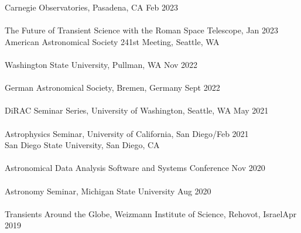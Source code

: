 \documentclass[10pt]{cv}
\begin{document}
\begin{llist}
\vspace{-0.1in}  
Carnegie Observatories, Pasadena, CA \hfill Feb 2023\\\vspace{-0.1in}%
\\
The Future of Transient Science with the Roman Space Telescope, \hfill Jan 2023\\
American Astronomical Society 241st Meeting, Seattle, WA\\ \vspace{-0.1in}%
\\
Washington State University, Pullman, WA \hfill Nov 2022\\\vspace{-0.1in}%
\\
German Astronomical Society, Bremen, Germany \hfill Sept 2022\\ \vspace{-0.1in}%
\\
DiRAC Seminar Series, University of Washington, Seattle, WA \hfill May 2021\\ \vspace{-0.1in}%
\\
Astrophysics Seminar, University of California, San Diego/\hfill Feb 2021\\ 
San Diego State University, San Diego, CA\\ \vspace{-0.1in}%
\\
Astronomical Data Analysis Software and Systems Conference \hfill Nov 2020\\\vspace{-0.1in}  %
\\
Astronomy Seminar, Michigan State University \hfill Aug 2020 \\\vspace{-0.1in} %
\\
Transients Around the Globe, Weizmann Institute of Science, Rehovot, Israel\hfill Apr 2019\\ \vspace{-0.1in}  %

\end{llist}
\end{document}
